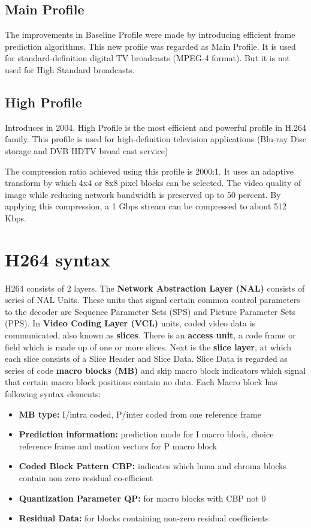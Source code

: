 \subsection{Main Profile}
The improvements in Baseline Profile were made by introducing efficient frame prediction algorithms. This new profile was regarded as Main Profile. It is used for standard-definition digital TV broadcasts (MPEG-4 format). But it is not used for High Standard broadcasts.

\subsection{High Profile}
Introduces in 2004, High Profile is the most efficient and powerful profile in H.264 family. This profile is used for high-definition television applications (Blu-ray Disc storage and DVB HDTV broad cast service) 

The compression ratio achieved using this profile is 2000:1. It uses an adaptive transform by which 4x4 or 8x8 pixel blocks can be selected. The video quality of image while reducing network bandwidth is preserved up to 50 percent. By applying this compression, a 1 Gbps stream can be compressed to about 512 Kbps.

\section{H264 syntax}
H264 consists of 2 layers. The \textbf{Network Abstraction Layer (NAL)} consists of series of NAL Units. These units that signal certain common control parameters to the decoder are Sequence Parameter Sets (SPS) and Picture Parameter Sets (PPS). In \textbf{Video Coding Layer (VCL)} units, coded video data is communicated, also known as \textbf{slices}. There is an \textbf{access unit}, a code frame or field which is made up of one or more slices. Next is the \textbf{slice layer}, at which each slice consists of a Slice Header and Slice Data. Slice Data is regarded as series of code \textbf{macro blocks (MB)} and skip macro block indicators which signal that certain macro block positions contain no data. Each Macro block has following syntax elements:

\begin{itemize}
	\item \textbf{MB type:} I/intra coded, P/inter coded from one reference frame
	\item \textbf{Prediction information:} prediction mode for I macro block, choice reference frame and motion vectors for P macro block
	\item \textbf{Coded Block Pattern CBP:} indicates which luma and chroma blocks contain non zero residual co-efficient
	\item \textbf{Quantization Parameter QP:} for macro blocks with CBP not 0
	\item \textbf{Residual Data:} for blocks containing non-zero residual coefficients
\end{itemize}

